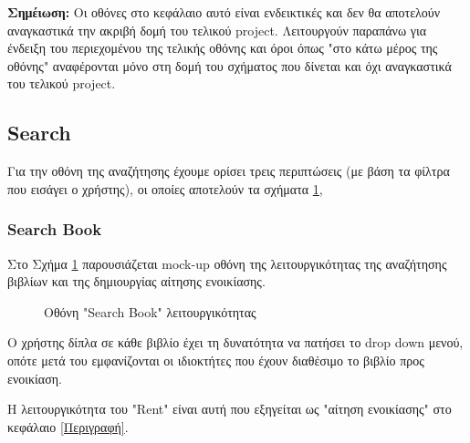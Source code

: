 \documentclass[12pt,a4paper]{article}
\begin{document}
\textbf{Σημέιωση:} Οι οθόνες στο κεφάλαιο αυτό είναι ενδεικτικές και δεν θα αποτελούν αναγκαστικά την ακριβή δομή του τελικού project. Λειτουργούν παραπάνω για ένδειξη του περιεχομένου της τελικής οθόνης και όροι όπως "στο κάτω μέρος της οθόνης" αναφέρονται μόνο στη δομή του σχήματος που δίνεται και όχι αναγκαστικά του τελικού project.

\subsection{Search}

Για την οθόνη της αναζήτησης έχουμε ορίσει τρεις περιπτώσεις (με βάση τα φίλτρα που εισάγει ο χρήστης), οι οποίες αποτελούν τα σχήματα \ref{Οθόνη "Search Book" λειτουργικότητας},

\subsubsection{Search Book}

Στο Σχήμα \ref{Οθόνη "Search Book" λειτουργικότητας} παρουσιάζεται mock-up οθόνη της λειτουργικότητας της αναζήτησης βιβλίων και της δημιουργίας αίτησης ενοικίασης.

\begin{figure}[H]
	\caption{Οθόνη "Search Book" λειτουργικότητας}
	\label{Οθόνη "Search Book" λειτουργικότητας}
\end{figure}

Ο χρήστης δίπλα σε κάθε βιβλίο έχει τη δυνατότητα να πατήσει το drop down μενού, οπότε μετά του εμφανίζονται οι ιδιοκτήτες που έχουν διαθέσιμο το βιβλίο προς ενοικίαση.

Η λειτουργικότητα του "Rent" είναι αυτή που εξηγείται ως "αίτηση ενοικίασης" στο κεφάλαιο \ref{Περιγραφή}.
\end{document}

